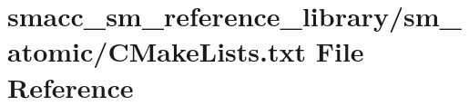 \hypertarget{smacc__sm__reference__library_2sm__atomic_2CMakeLists_8txt}{}\section{smacc\+\_\+sm\+\_\+reference\+\_\+library/sm\+\_\+atomic/\+C\+Make\+Lists.txt File Reference}
\label{smacc__sm__reference__library_2sm__atomic_2CMakeLists_8txt}
